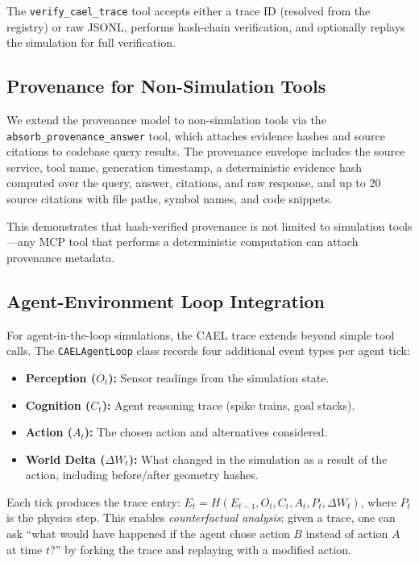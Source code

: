 \documentclass[letterpaper,twocolumn,10pt]{article}
\begin{document}
The \texttt{verify\_cael\_trace} tool accepts either a trace ID (resolved from
the registry) or raw JSONL, performs hash-chain verification, and optionally
replays the simulation for full verification.

\subsection{Provenance for Non-Simulation Tools}

We extend the provenance model to non-simulation tools via the
\texttt{absorb\_provenance\_answer} tool, which attaches evidence hashes
and source citations to codebase query results. The provenance envelope
includes the source service, tool name, generation timestamp, a deterministic
evidence hash computed over the query, answer, citations, and raw response,
and up to 20 source citations with file paths, symbol names, and code
snippets.

This demonstrates that hash-verified provenance is not limited to simulation
tools---any MCP tool that performs a deterministic computation can attach
provenance metadata.

\subsection{Agent-Environment Loop Integration}

For agent-in-the-loop simulations, the CAEL trace extends beyond simple
tool calls. The \texttt{CAELAgentLoop} class records four additional event
types per agent tick:

\begin{itemize}[nosep,leftmargin=*]
\item \textbf{Perception ($O_t$):} Sensor readings from the simulation state.
\item \textbf{Cognition ($C_t$):} Agent reasoning trace (spike trains, goal
  stacks).
\item \textbf{Action ($A_t$):} The chosen action and alternatives considered.
\item \textbf{World Delta ($\Delta W_t$):} What changed in the simulation as
  a result of the action, including before/after geometry hashes.
\end{itemize}

\noindent Each tick produces the trace entry:
$E_t = H(E_{t-1}, O_t, C_t, A_t, P_t, \Delta W_t)$, where $P_t$ is the
physics step. This enables \emph{counterfactual analysis}: given a trace,
one can ask ``what would have happened if the agent chose action $B$ instead
of action $A$ at time $t$?'' by forking the trace and replaying with a
modified action.
\end{document}
